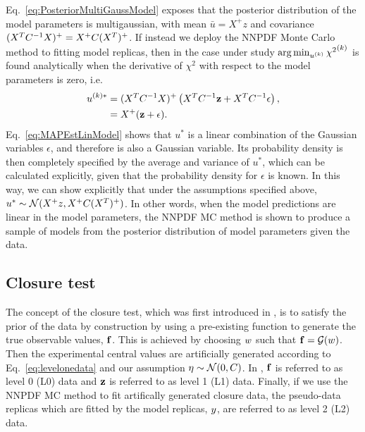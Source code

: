 Eq.~\ref{eq:PosteriorMultiGaussModel} exposes that the posterior distribution of
the model parameters is multigaussian, with mean $\bar{u} = X^+z$ and covariance
$(X^TC^{-1}_{}X)^+ = X^+ C (X^T)^+$. If instead we deploy the NNPDF Monte
Carlo method to fitting model replicas, then in the case under study
$\arg\min_{u^{(k)}} {\chi^2}^{(k)}$ is found analytically when the derivative of
$\chi^2$ with respect to the model parameters is zero, i.e.
\begin{equation}
    \label{eq:MAPEstLinModel}
    \begin{split}
        u^{(k) *} &= (X^TC^{-1}_{}X)^{+}
        \left( X^T C^{-1}_{} \mathbf{z} + X^T C^{-1}_{} \mathbf{\epsilon} \right), \\
        &= X^+ (\mathbf{z} + \mathbf{\epsilon}).
    \end{split}
\end{equation}
Eq.~\ref{eq:MAPEstLinModel} shows that $u^*$ is a linear combination of the
Gaussian variables $\epsilon$, and therefore is also a Gaussian variable. Its
probability density is then completely specified by the average and variance of
$u^*$, which can be calculated explicitly, given that the probability density
for $\epsilon$ is known.  In this way, we can show explicitly that under the
assumptions specified above, $u^{*} \sim \mathcal{N}( X^+z, X^+ C (X^T)^+)$.
In other words, when the model predictions are linear in the model parameters,
the NNPDF MC method is shown to produce a sample of models from the posterior
distribution of model parameters given the data.

\subsection{Closure test}

The concept of the closure test, which was first introduced in \cite{nnpdf30},
is to satisfy the prior of the data by construction by using a pre-existing
function to generate the true observable values, $\mathbf{f}$. This is achieved
by choosing $w$ such that $\mathbf{f} = \mathcal{G}(w)$. Then
the experimental central values are artificially generated according to
Eq.~\ref{eq:levelonedata} and our assumption
$\mathbf{\eta} \sim \mathcal{N}(0, C)$. In \cite{nnpdf30}, $\mathbf{f}$ is
referred to as level 0 (L0) data and $\mathbf{z}$ is referred to as
level 1 (L1) data. Finally, if we use the NNPDF MC method to fit artifically
generated closure data, the pseudo-data replicas which are fitted by the model
replicas, $y$, are referred to as level 2 (L2) data.


